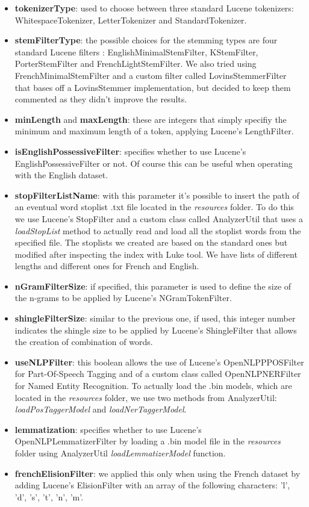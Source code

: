 \begin{itemize}
  \item \textbf{tokenizerType}: used to choose between three standard Lucene tokenizers: WhitespaceTokenizer, LetterTokenizer and StandardTokenizer.
  \item \textbf{stemFilterType}: the possible choices for the stemming types are four standard Lucene filters : EnglishMinimalStemFilter, KStemFilter, PorterStemFilter and FrenchLightStemFilter. We also tried using FrenchMinimalStemFilter and a custom filter called LovinsStemmerFilter that bases off a LovinsStemmer implementation, but decided to keep them commented as they didn't improve the results.
  \item \textbf{minLength} and \textbf{maxLength}: these are integers that simply specifiy the minimum and maximum length of a token, applying Lucene's LengthFilter.
  \item \textbf{isEnglishPossessiveFilter}: specifies whether to use Lucene's EnglishPossessiveFilter or not. Of course this can be useful when operating with the English dataset.
  \item \textbf{stopFilterListName}: with this parameter it's possible to insert the path of an eventual word stoplist .txt file located in the \textit{resources} folder. To do this we use Lucene's StopFilter and a custom class called AnalyzerUtil that uses a \textit{loadStopList} method to actually read and load all the stoplist words from the specified file. The stoplists we created are based on the standard ones but modified after inspecting the index with Luke tool. We have lists of different lengths and different ones for French and English.
  \item \textbf{nGramFilterSize}: if specified, this parameter is used to define the size of the n-grams to be applied by Lucene's NGramTokenFilter.
  \item \textbf{shingleFilterSize}: similar to the previous one, if used, this integer number indicates the shingle size to be applied by Lucene's ShingleFilter that allows the creation of combination of words.
  \item \textbf{useNLPFilter}: this boolean allows the use of Lucene's OpenNLPPPOSFilter for Part-Of-Speech Tagging and of a custom class called OpenNLPNERFilter for Named Entity Recognition. To actually load the .bin models, which are located in the \textit{resources} folder, we use two methods from AnalyzerUtil: \textit{loadPosTaggerModel} and \textit{loadNerTaggerModel}.
  \item \textbf{lemmatization}: specifies whether to use Lucene's OpenNLPLemmatizerFilter by loading a .bin model file in the \textit{resources} folder using AnalyzerUtil \textit{loadLemmatizerModel} function.
  \item \textbf{frenchElisionFilter}: we applied this only when using the French dataset by adding Lucene's ElisionFilter with an array of the following characters: 'l', 'd', 's', 't', 'n', 'm'.
\end{itemize}
